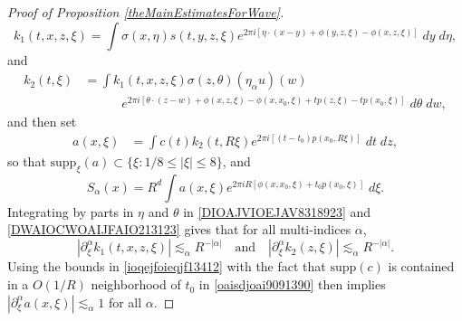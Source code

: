 \begin{proof}[Proof of Proposition \ref{theMainEstimatesForWave}]
%
\begin{equation} \label{DIOAJVIOEJAV8318923}
    k_1(t,x,z,\xi) = \int \sigma(x,\eta) s(t,y,z,\xi) e^{2 \pi i [ \eta \cdot (x - y) + \phi(y,z,\xi) - \phi(x,z,\xi) ]}\; dy\; d\eta,
\end{equation}
%
and
%
\begin{equation} \label{DWAIOCWOAIJFAIO213123}
\begin{split}
    k_2(t,\xi) &= \int k_1(t,x,z,\xi) \sigma(z,\theta) (\eta_\alpha u)(w)\\
    &\quad\quad\quad e^{2 \pi i [ \theta \cdot (z - w) + \phi(x,z,\xi) - \phi(x,x_0,\xi) + t p(z,\xi) - t p(x_0,\xi) ]}\; d\theta\; dw,
\end{split}
\end{equation}
%
and then set
%
\begin{equation} \label{oaisdjoai9091390}
\begin{split}
    a(x,\xi) &= \int c(t) k_2(t,R \xi) e^{2 \pi i [ (t - t_0) p(x_0, R \xi) ]} \; dt\; dz,
\end{split}
\end{equation}
%
so that $\text{supp}_\xi(a) \subset \{ \xi : 1/8 \leq |\xi| \leq 8 \}$, and
%
\begin{equation}
    S_\alpha(x) = R^d \int a(x, \xi) e^{2 \pi i R [ \phi(x,x_0,\xi) + t_0 p(x_0,\xi) ]}\; d\xi.
\end{equation}
%
Integrating by parts in $\eta$ and $\theta$ in \eqref{DIOAJVIOEJAV8318923} and \eqref{DWAIOCWOAIJFAIO213123} gives that for all multi-indices $\alpha$,
%
\begin{equation} \label{ioqejfoieqjf13412}
    |\partial_\xi^\alpha k_1(t,x,z,\xi)| \lesssim_\alpha R^{-|\alpha|} \quad\text{and}\quad |\partial_\xi^\alpha k_2(z,\xi)| \lesssim_{\alpha} R^{-|\alpha|}.
\end{equation}
%
Using the bounds in \eqref{ioqejfoieqjf13412} with the fact that $\text{supp}(c)$ is contained in a $O(1/R)$ neighborhood of $t_0$ in \eqref{oaisdjoai9091390} then implies $|\partial_\xi^\alpha a(x,\xi)| \lesssim_\alpha 1$ for all $\alpha$.
%
%
%
%
%


\end{proof}
